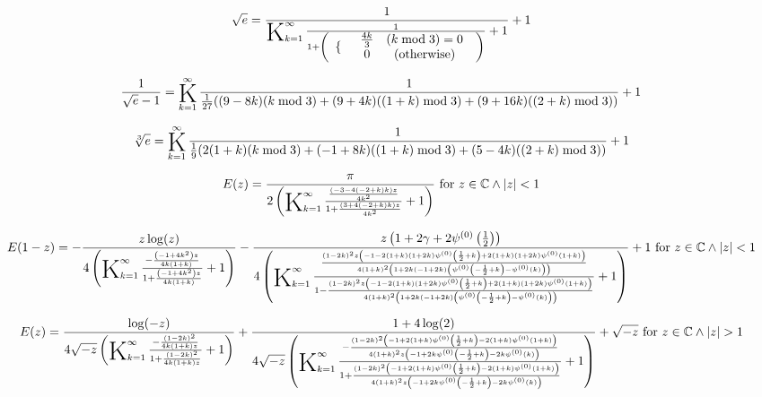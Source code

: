 \documentclass{article}
\newcommand{\bigK}{\mathop{\raisebox{-5pt}{\huge K}}}
\begin{document}
\[\sqrt{e}=\frac{1}{\bigK_{k=1}^{\infty}\frac{1}{1+\left( \begin{array}{cc}  \{ &  \begin{array}{cc}  \frac{4 k}{3} & (k \bmod 3)=0 \\  0 & (\text{otherwise}) \\ \end{array}  \\ \end{array} \right)}+1}+1\] 

\[\frac{1}{\sqrt{e}-1}=\bigK_{k=1}^{\infty}\frac{1}{\frac{1}{27} ((9-8 k) (k \bmod 3)+(9+4 k) ((1+k) \bmod 3)+(9+16 k) ((2+k) \bmod 3))}+1\] 

\[\sqrt[3]{e}=\bigK_{k=1}^{\infty}\frac{1}{\frac{1}{9} (2 (1+k) (k \bmod 3)+(-1+8 k) ((1+k) \bmod 3)+(5-4 k) ((2+k) \bmod 3))}+1\] 

\[E(z)=\frac{\pi }{2 \left(\bigK_{k=1}^{\infty}\frac{\frac{(-3-4 (-2+k) k) z}{4 k^2}}{1+\frac{(3+4 (-2+k) k) z}{4 k^2}}+1\right)}\text{ for }z\in \mathbb{C}\land \left| z\right| <1\] 

\[E(1-z)=-\frac{z \log (z)}{4 \left(\bigK_{k=1}^{\infty}\frac{-\frac{\left(-1+4 k^2\right) z}{4 k (1+k)}}{1+\frac{\left(-1+4 k^2\right) z}{4 k (1+k)}}+1\right)}-\frac{z \left(1+2 \gamma +2 \psi ^{(0)}\left(\frac{1}{2}\right)\right)}{4 \left(\bigK_{k=1}^{\infty}\frac{\frac{(1-2 k)^2 z \left(-1-2 (1+k) (1+2 k) \psi ^{(0)}\left(\frac{1}{2}+k\right)+2 (1+k) (1+2 k) \psi ^{(0)}(1+k)\right)}{4 (1+k)^2 \left(1+2 k (-1+2 k) \left(\psi ^{(0)}\left(-\frac{1}{2}+k\right)-\psi ^{(0)}(k)\right)\right)}}{1-\frac{(1-2 k)^2 z \left(-1-2 (1+k) (1+2 k) \psi ^{(0)}\left(\frac{1}{2}+k\right)+2 (1+k) (1+2 k) \psi ^{(0)}(1+k)\right)}{4 (1+k)^2 \left(1+2 k (-1+2 k) \left(\psi ^{(0)}\left(-\frac{1}{2}+k\right)-\psi ^{(0)}(k)\right)\right)}}+1\right)}+1\text{ for }z\in \mathbb{C}\land \left| z\right| <1\] 

\[E(z)=\frac{\log (-z)}{4 \sqrt{-z} \left(\bigK_{k=1}^{\infty}\frac{-\frac{(1-2 k)^2}{4 k (1+k) z}}{1+\frac{(1-2 k)^2}{4 k (1+k) z}}+1\right)}+\frac{1+4 \log (2)}{4 \sqrt{-z} \left(\bigK_{k=1}^{\infty}\frac{-\frac{(1-2 k)^2 \left(-1+2 (1+k) \psi ^{(0)}\left(\frac{1}{2}+k\right)-2 (1+k) \psi ^{(0)}(1+k)\right)}{4 (1+k)^2 z \left(-1+2 k \psi ^{(0)}\left(-\frac{1}{2}+k\right)-2 k \psi ^{(0)}(k)\right)}}{1+\frac{(1-2 k)^2 \left(-1+2 (1+k) \psi ^{(0)}\left(\frac{1}{2}+k\right)-2 (1+k) \psi ^{(0)}(1+k)\right)}{4 (1+k)^2 z \left(-1+2 k \psi ^{(0)}\left(-\frac{1}{2}+k\right)-2 k \psi ^{(0)}(k)\right)}}+1\right)}+\sqrt{-z}\text{ for }z\in \mathbb{C}\land \left| z\right| >1\] 
\end{document}
